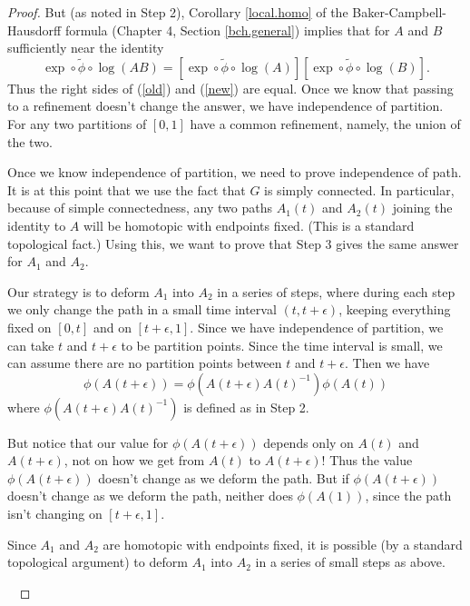 \documentclass[12pt]{amsbook}
\theoremstyle{plain}
\numberwithin{equation}{chapter}
\numberwithin{theorem}{chapter}
\begin{document}
\begin{proof}
But (as noted in Step 2), Corollary \ref{local.homo} of the
Baker-Campbell-Hausdorff formula (Chapter 4, Section \ref{bch.general})
implies that for $A$ and $B$ sufficiently near the identity
\[
\exp\circ\widetilde{\phi}\circ\log(AB)=\left[  \exp\circ\widetilde{\phi}%
\circ\log(A)\right]  \left[  \exp\circ\widetilde{\phi}\circ\log(B)\right]
\text{.}%
\]
Thus the right sides of (\ref{old}) and (\ref{new}) are equal. Once we know
that passing to a refinement doesn't change the answer, we have independence
of partition. For any two partitions of $\left[  0,1\right]  $ have a common
refinement, namely, the union of the two.

Once we know independence of partition, we need to prove independence of path.
It is at this point that we use the fact that $G$ is simply connected. In
particular, because of simple connectedness, any two paths $A_{1}(t)$ and
$A_{2}(t)$ joining the identity to $A$ will be homotopic with endpoints fixed.
(This is a standard topological fact.) Using this, we want to prove that Step
3 gives the same answer for $A_{1}$ and $A_{2}$.

Our strategy is to deform $A_{1}$ into $A_{2}$ in a series of steps, where
during each step we only change the path in a small time interval
$(t,t+\epsilon)$, keeping everything fixed on $[0,t]$ and on $[t+\epsilon,1]$.
Since we have independence of partition, we can take $t$ and $t+\epsilon$ to
be partition points. Since the time interval is small, we can assume there are
no partition points between $t$ and $t+\epsilon$. Then we have
\[
\phi\left(  A(t+\epsilon)\right)  =\phi\left(  A(t+\epsilon)A(t)^{-1}\right)
\phi\left(  A(t)\right)
\]
where $\phi\left(  A(t+\epsilon)A(t)^{-1}\right)  $ is defined as in Step 2.

But notice that our value for $\phi\left(  A(t+\epsilon)\right)  $ depends
only on $A\left(  t\right)  $ and $A\left(  t+\epsilon\right)  $, not on how
we get from $A\left(  t\right)  $ to $A\left(  t+\epsilon\right)  $! Thus the
value $\phi\left(  A(t+\epsilon)\right)  $ doesn't change as we deform the
path. But if $\phi\left(  A(t+\epsilon)\right)  $ doesn't change as we deform
the path, neither does $\phi\left(  A(1)\right)  $, since the path isn't
changing on $[t+\epsilon,1]$.

Since $A_{1}$ and $A_{2}$ are homotopic with endpoints fixed, it is possible
(by a standard topological argument) to deform $A_{1}$ into $A_{2}$ in a
series of small steps as above.

\ 


\end{proof}
\end{document}
